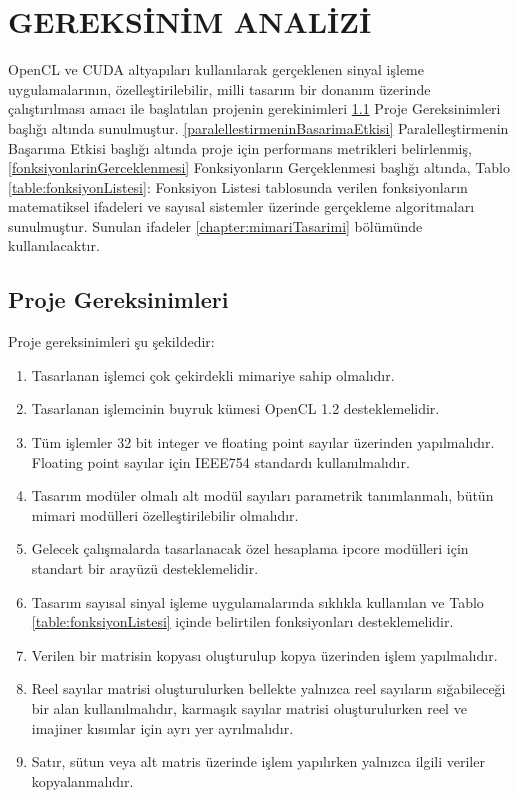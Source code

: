 \chapter{GEREKSİNİM ANALİZİ} \label{chapter:gereksinimAnalizi}
OpenCL ve CUDA altyapıları kullanılarak gerçeklenen sinyal işleme uygulamalarının, özelleştirilebilir, milli tasarım bir donanım üzerinde çalıştırılması amacı ile başlatılan projenin gerekinimleri \ref{projeGereksinimleri} Proje Gereksinimleri başlığı altında sunulmuştur. \ref{paralellestirmeninBasarimaEtkisi} Paralelleştirmenin Başarıma Etkisi başlığı altında proje için performans metrikleri belirlenmiş, \ref{fonksiyonlarinGerceklenmesi} Fonksiyonların Gerçeklenmesi başlığı altında, Tablo \ref{table:fonksiyonListesi}: Fonksiyon Listesi tablosunda verilen fonksiyonların matematiksel ifadeleri ve sayısal sistemler üzerinde gerçekleme algoritmaları sunulmuştur. Sunulan ifadeler \ref{chapter:mimariTasarimi} bölümünde kullanılacaktır. 
\newpage
\section{Proje Gereksinimleri} \label{projeGereksinimleri}
 Proje gereksinimleri şu şekildedir: 
\begin{enumerate}
  \item Tasarlanan işlemci çok çekirdekli mimariye sahip olmalıdır.
  \item Tasarlanan işlemcinin buyruk kümesi OpenCL 1.2 desteklemelidir. 
  \item Tüm işlemler 32 bit integer ve floating point sayılar üzerinden yapılmalıdır. Floating point sayılar için IEEE754 standardı kullanılmalıdır.
  \item Tasarım modüler olmalı alt modül sayıları parametrik tanımlanmalı, bütün mimari modülleri özelleştirilebilir olmalıdır. 
  \item Gelecek çalışmalarda tasarlanacak özel hesaplama ipcore modülleri için standart bir arayüzü desteklemelidir.
  \item Tasarım sayısal sinyal işleme uygulamalarında sıklıkla kullanılan ve Tablo \ref{table:fonksiyonListesi} içinde belirtilen fonksiyonları desteklemelidir.
  \item Verilen bir matrisin kopyası oluşturulup kopya üzerinden işlem yapılmalıdır.
  \item Reel sayılar matrisi oluşturulurken bellekte yalnızca reel sayıların sığabileceği bir alan kullanılmalıdır, karmaşık sayılar matrisi oluşturulurken reel ve imajiner kısımlar için ayrı yer ayrılmalıdır.
  \item Satır, sütun veya alt matris üzerinde işlem yapılırken yalnızca ilgili veriler kopyalanmalıdır.
  \newpage
  	
  
\end{enumerate}

